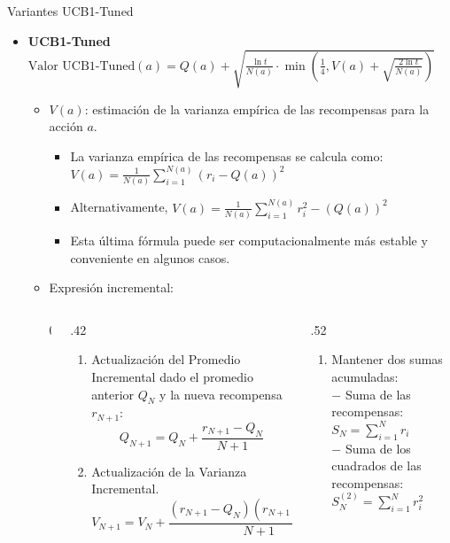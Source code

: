\documentclass[10pt, envcountsect, handout, aspectratio=1610, hyperref={hypertexnames=true}]{beamer}
\begin{document}

\begin{frame}{Variantes UCB1-Tuned}

\begin{itemize}
\item \textbf{UCB1-Tuned} $\text{Valor UCB1-Tuned}(a) = Q(a) + \sqrt{\frac{\ln t}{N(a)} \cdot \min \left( \frac{1}{4}, V(a) + \sqrt{\frac{2 \ln t}{N(a)}} \right)}$
    \begin{itemize}
     \item \( V(a) \): estimación de la varianza empírica de las recompensas para la acción \( a \).
        
        \begin{itemize}
        \item La varianza empírica de las recompensas se calcula como: $ V(a) = \frac{1}{N(a)} \sum_{i=1}^{N(a)} (r_i - Q(a))^2$
        \item Alternativamente, $ V(a) = \frac{1}{N(a)} \sum_{i=1}^{N(a)} r_i^2 - \left(Q(a)\right)^2$
		\item Esta última fórmula puede ser computacionalmente más estable y conveniente en algunos casos.
		\end{itemize}

		
		
	\item Expresión incremental:
	\begin{columns}
	\begin{column}{0\textwidth}
	\end{column}
	\begin{column}{.42\textwidth}
		\begin{enumerate}
		\item[\textbf{1.}]  Actualización del Promedio Incremental dado el promedio anterior \( Q_N \) y la nueva recompensa \( r_{N+1} \):
		\[
		Q_{N+1} = Q_N + \frac{r_{N+1} - Q_N}{N+1}
		\]

		\item[\textbf{2.}] Actualización de la Varianza Incremental. 
		\[
		V_{N+1} = V_N + \frac{(r_{N+1} - Q_N)(r_{N+1} - Q_{N+1})}{N+1}
		\]
		\end{enumerate}
	\end{column}
	\begin{column}{.52\textwidth}
		\begin{enumerate}
		\item Mantener dos sumas acumuladas: \\
			$-$ Suma de las recompensas: \( S_N = \sum_{i=1}^{N} r_i \) \\
			$-$ Suma de los cuadrados de las recompensas: \( S_N^{(2)} = \sum_{i=1}^{N} r_i^2 \)
			

\end{enumerate}
\end{column}
\end{columns}
\end{itemize}
\end{itemize}
\end{frame}
\end{document}

